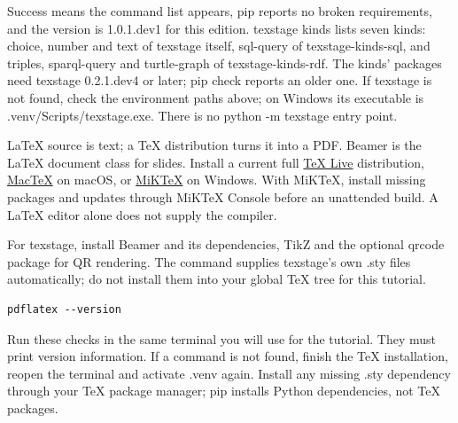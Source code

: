 \documentclass[a4paper,11pt]{article}
\begin{document}
Success means the command list appears, pip reports no broken requirements, and the version is 1.\allowbreak{}0.\allowbreak{}1.\allowbreak{}dev1 for this edition.\allowbreak{} texstage kinds lists seven kinds: choice, number and text of texstage itself, sql-\allowbreak{}query of texstage-\allowbreak{}kinds-\allowbreak{}sql, and triples, sparql-\allowbreak{}query and turtle-\allowbreak{}graph of texstage-\allowbreak{}kinds-\allowbreak{}rdf.\allowbreak{} The kinds' packages need texstage 0.\allowbreak{}2.\allowbreak{}1.\allowbreak{}dev4 or later; pip check reports an older one.\allowbreak{} If texstage is not found, check the environment paths above; on Windows its executable is .\allowbreak{}venv/\allowbreak{}Scripts/\allowbreak{}texstage.\allowbreak{}exe.\allowbreak{} There is no python -\allowbreak{}m texstage entry point.\par

LaTeX source is text; a TeX distribution turns it into a PDF.\allowbreak{} Beamer is the LaTeX document class for slides.\allowbreak{} Install a current full \href{https://tug.org/texlive/}{TeX Live} distribution, \href{https://tug.org/mactex/}{MacTeX} on macOS, or \href{https://miktex.org/howto/install-miktex}{MiKTeX} on Windows.\allowbreak{} With MiKTeX, install missing packages and updates through MiKTeX Console before an unattended build.\allowbreak{} A LaTeX editor alone does not supply the compiler.\par

For texstage, install Beamer and its dependencies, TikZ and the optional qrcode package for QR rendering.\allowbreak{} The command supplies texstage's own .\allowbreak{}sty files automatically; do not install them into your global TeX tree for this tutorial.\par

\par\noindent\begin{minipage}{\linewidth}
\begin{Verbatim}
pdflatex --version
\end{Verbatim}
\end{minipage}\par\smallskip

Run these checks in the same terminal you will use for the tutorial.\allowbreak{} They must print version information.\allowbreak{} If a command is not found, finish the TeX installation, reopen the terminal and activate .\allowbreak{}venv again.\allowbreak{} Install any missing .\allowbreak{}sty dependency through your TeX package manager; pip installs Python dependencies, not TeX packages.\par
\end{document}
